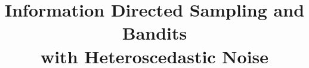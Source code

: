 \documentclass[12pt]{colt2018} %
\title[Information Directed Sampling and Bandits with Heteroscedastic Noise]{Information Directed Sampling and Bandits\\ with Heteroscedastic Noise}
\begin{document}
\newtheorem*{lemma*}{Lemma}
\maketitle


\begin{abstract}
	
\end{abstract}



\end{document}
